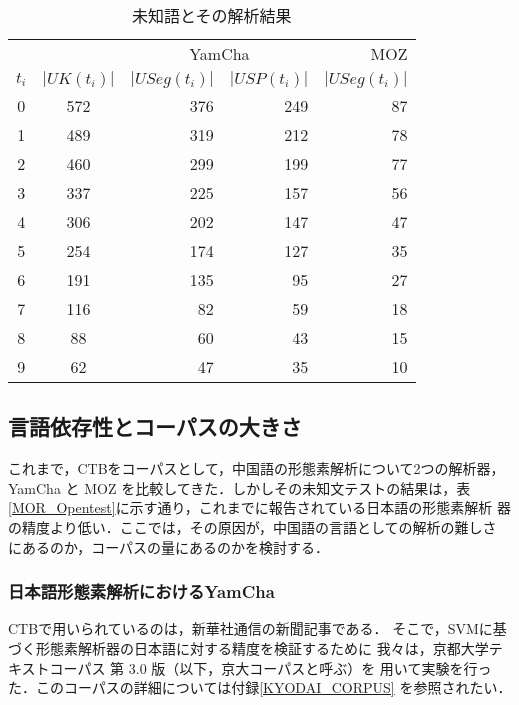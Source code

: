 \begin{table}[htb]
 \begin{center}
  \caption{未知語とその解析結果}
\label{UK_Analyze_table}
\begin{tabular}{cc|rr|r}
\hline
      &     & \multicolumn{2}{c|}{YamCha}          & MOZ\\
\cline{3-5}
 $t_i$& $|UK(t_i)|$ & $|USeg(t_i)|$ & $|USP(t_i)|$ & $|USeg(t_i)|$\\
\hline
 0    & 572         & 376           & 249          & 87\\
 1    & 489         & 319           & 212          & 78\\
 2    & 460         & 299           & 199          & 77\\
 3    & 337        & 225           & 157         & 56\\
 4    & 306        & 202           & 147          & 47\\
 5    & 254        & 174           & 127          & 35\\
 6    & 191        & 135           & 95          & 27\\
 7    & 116         & 82           & 59           & 18\\
 8    & 88         & 60            & 43           & 15\\
 9    & 62          & 47            & 35           & 10\\
\hline
\end{tabular}
 \end{center}
\end{table}

\subsection{言語依存性とコーパスの大きさ}
これまで，CTBをコーパスとして，中国語の形態素解析について2つの解析器，
YamCha と MOZ を比較してきた．しかしその未知文テストの結果は，表
\ref{MOR_Opentest}に示す通り，これまでに報告されている日本語の形態素解析
器の精度より低い．ここでは，その原因が，中国語の言語としての解析の難しさ
にあるのか，コーパスの量にあるのかを検討する．

\subsubsection{日本語形態素解析におけるYamCha}
CTBで用いられているのは，新華社通信の新聞記事である．
そこで，SVMに基づく形態素解析器の日本語に対する精度を検証するために
我々は，京都大学テキストコーパス 第 3.0 版（以下，京大コーパスと呼ぶ）を
用いて実験を行った．このコーパスの詳細については付録\ref{KYODAI_CORPUS}
を参照されたい．


